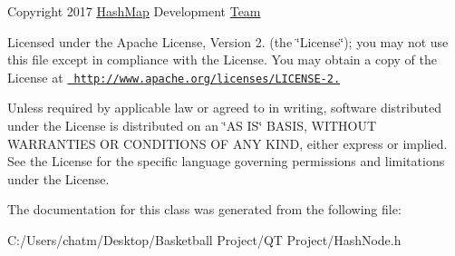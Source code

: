 Copyright 2017 \mbox{\hyperlink{class_hash_map}{Hash\+Map}} Development \mbox{\hyperlink{class_team}{Team}}

Licensed under the Apache License, Version 2. (the \char`\"{}\+License\char`\"{}); you may not use this file except in compliance with the License. You may obtain a copy of the License at \href{http://www.apache.org/licenses/LICENSE-2.0}{\texttt{ http\+://www.\+apache.\+org/licenses/\+L\+I\+C\+E\+N\+S\+E-\/2.}}

Unless required by applicable law or agreed to in writing, software distributed under the License is distributed on an \char`\"{}\+A\+S I\+S\char`\"{} B\+A\+S\+IS, W\+I\+T\+H\+O\+UT W\+A\+R\+R\+A\+N\+T\+I\+ES OR C\+O\+N\+D\+I\+T\+I\+O\+NS OF A\+NY K\+I\+ND, either express or implied. See the License for the specific language governing permissions and limitations under the License. 

The documentation for this class was generated from the following file\+:\begin{DoxyCompactItemize}
\item 
C\+:/\+Users/chatm/\+Desktop/\+Basketball Project/\+Q\+T Project/Hash\+Node.\+h\end{DoxyCompactItemize}
